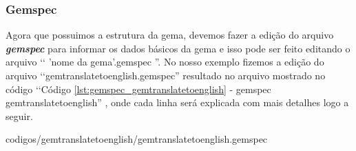\subsubsection{Gemspec}
\label{subsubsection:gemspec}

Agora que possuimos a estrutura da gema, devemos fazer a edição do arquivo \emph{\textbf{gemspec}} 
para informar os dados básicos da gema e isso pode ser feito editando o arquivo ‘‘ 'nome da gema'.gemspec ''. 
No nosso exemplo fizemos a edição do arquivo ‘‘gemtranslatetoenglish.gemspec'' resultado no arquivo mostrado 
no código ‘‘Código \ref{lst:gemspec_gemtranslatetoenglish} - gemspec gemtranslatetoenglish''
, onde cada linha será explicada com mais detalhes logo a seguir.


{codigos/gemtranslatetoenglish/gemtranslatetoenglish.gemspec}

